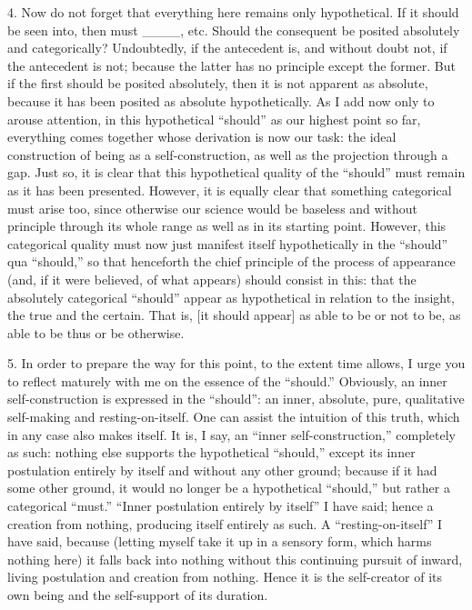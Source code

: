 4. Now do not forget that everything here
remains only hypothetical.
If it should be seen into, then must ____, etc.
Should the consequent be posited
absolutely and categorically?
Undoubtedly, if the antecedent is,
and without doubt not, if the antecedent is not;
because the latter has no principle except the former.
But if the first should be posited absolutely,
then it is not apparent as absolute,
because it has been posited as absolute hypothetically.
As I add now only to arouse attention,
in this hypothetical “should” as our highest point so far,
everything comes together whose derivation is now our task:
the ideal construction of being as a self-construction,
as well as the projection through a gap.
Just so, it is clear that this hypothetical quality
of the “should” must remain as it has been presented.
However, it is equally clear that
something categorical must arise too,
since otherwise our science would be baseless
and without principle through its whole range
as well as in its starting point.
However, this categorical quality
must now just manifest itself hypothetically
in the “should” qua “should,”
so that henceforth the chief principle
of the process of appearance
(and, if it were believed, of what appears)
should consist in this:
that the absolutely categorical “should”
appear as hypothetical in relation to the insight,
the true and the certain.
That is, [it should appear]
as able to be or not to be,
as able to be thus or be otherwise.

5. In order to prepare the way for this point,
to the extent time allows,
I urge you to reflect maturely with me
on the essence of the “should.”
Obviously, an inner self-construction is
expressed in the “should”:
an inner, absolute, pure, qualitative
self-making and resting-on-itself.
One can assist the intuition of this truth,
which in any case also makes itself.
It is, I say, an “inner self-construction,”
completely as such:
nothing else supports the hypothetical “should,”
except its inner postulation entirely by itself
and without any other ground;
because if it had some other ground,
it would no longer be a hypothetical “should,”
but rather a categorical “must.”
“Inner postulation entirely by itself”
I have said; hence a creation from nothing,
producing itself entirely as such.
A “resting-on-itself” I have said, because
(letting myself take it up in a sensory form,
which harms nothing here)
it falls back into nothing
without this continuing pursuit of
inward, living postulation
and creation from nothing.
Hence it is the self-creator of its own being
and the self-support of its duration.

